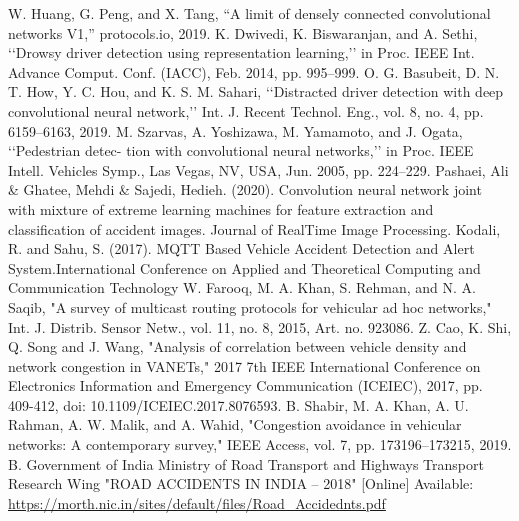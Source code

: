 \documentclass[ 12pt,a4paper,twocolumn,fleqn]{article}
\begin{document}
\begin{adjustwidth}{3.5em}{0pt}
\begin{thebibliography}{8}
W. Huang, G. Peng, and X. Tang, “A limit of densely connected convolutional networks V1,” protocols.io, 2019.
K. Dwivedi, K. Biswaranjan, and A. Sethi, ‘‘Drowsy driver detection
using representation learning,’’ in Proc. IEEE Int. Advance Comput. Conf.
(IACC), Feb. 2014, pp. 995–999.
O. G. Basubeit, D. N. T. How, Y. C. Hou, and K. S. M. Sahari, ‘‘Distracted
driver detection with deep convolutional neural network,’’ Int. J. Recent
Technol. Eng., vol. 8, no. 4, pp. 6159–6163, 2019.
M. Szarvas, A. Yoshizawa, M. Yamamoto, and J. Ogata, ‘‘Pedestrian detec-
tion with convolutional neural networks,’’ in Proc. IEEE Intell. Vehicles
Symp., Las Vegas, NV, USA, Jun. 2005, pp. 224–229.
Pashaei, Ali \& Ghatee, Mehdi \& Sajedi, Hedieh. (2020). Convolution neural network joint with mixture of extreme learning machines for feature extraction and classification of accident images. Journal of RealTime Image Processing.
Kodali, R. and Sahu, S. (2017). MQTT Based Vehicle Accident Detection and Alert System.International Conference on Applied and Theoretical Computing and Communication Technology
W. Farooq, M. A. Khan, S. Rehman, and N. A. Saqib, "A survey of multicast routing protocols for vehicular ad hoc networks," Int. J. Distrib. Sensor Netw., vol. 11, no. 8, 2015, Art. no. 923086.
Z. Cao, K. Shi, Q. Song and J. Wang, "Analysis of correlation between vehicle density and network congestion in VANETs," 2017 7th IEEE International Conference on Electronics Information and Emergency Communication (ICEIEC), 2017, pp. 409-412, doi: 10.1109/ICEIEC.2017.8076593.
B. Shabir, M. A. Khan, A. U. Rahman, A. W. Malik, and A. Wahid, "Congestion avoidance in vehicular networks: A contemporary survey," IEEE Access, vol. 7, pp. 173196–173215, 2019.
B. Government of India Ministry of Road Transport and Highways Transport Research Wing "ROAD ACCIDENTS IN INDIA – 2018" [Online] Available: \url{https://morth.nic.in/sites/default/files/Road_Accidednts.pdf}
\end{thebibliography}

\end{adjustwidth}
\end{document}
